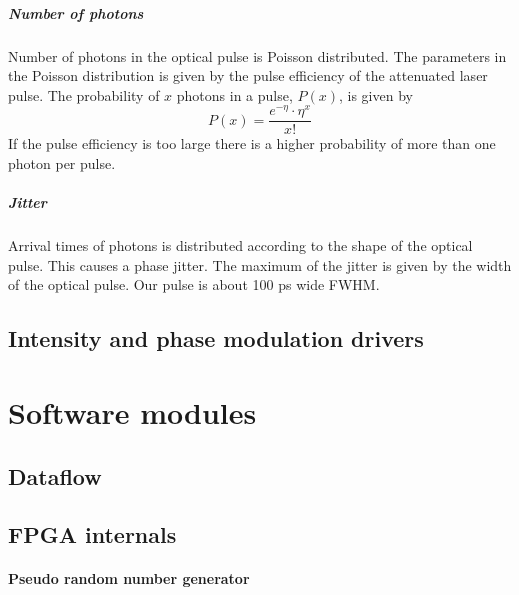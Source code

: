 \subparagraph{Number of photons}

Number of photons in the optical pulse is Poisson distributed. The
parameters in the Poisson distribution is given by the pulse
efficiency of the attenuated laser pulse. The probability of $x$
photons in a pulse, $P(x)$, is given by
\begin{equation}
  P(x)= \frac{e^{-\eta}\cdot{\eta^x}}{x!}
\end{equation}
If the pulse efficiency is too large there is a higher probability of
more than one photon per pulse.


\subparagraph{Jitter}

Arrival times of photons is distributed according to the shape of the
optical pulse. This causes a phase jitter. The maximum of the jitter
is given by the width of the optical pulse. Our pulse is about 100 ps
wide FWHM.


\subsection{Intensity and phase modulation drivers}


\section{Software modules}


\subsection{Dataflow}


\subsection{FPGA internals}


\paragraph{Pseudo random number generator}

